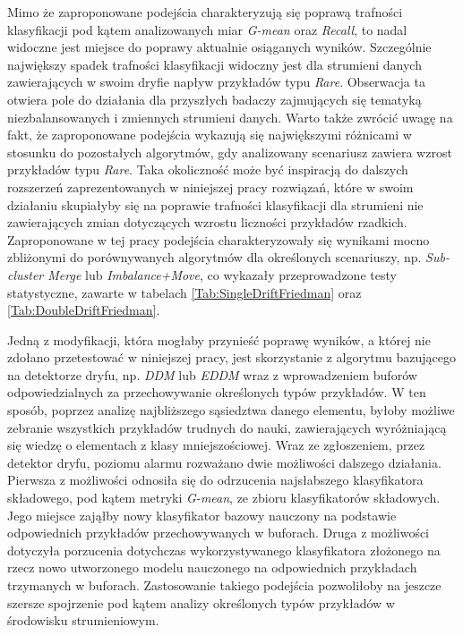 Mimo że zaproponowane podejścia charakteryzują się poprawą trafności klasyfikacji pod kątem analizowanych miar \textit{G-mean} oraz \textit{Recall}, to nadal widoczne jest miejsce do poprawy aktualnie osiąganych wyników. Szczególnie największy spadek trafności klasyfikacji widoczny jest dla strumieni danych zawierających w swoim dryfie napływ przykładów typu \textit{Rare}. Obserwacja ta otwiera pole do działania dla przyszłych badaczy zajmujących się tematyką niezbalansowanych i zmiennych strumieni danych. Warto także zwrócić uwagę na fakt, że zaproponowane podejścia wykazują się największymi różnicami w stosunku do pozostałych algorytmów, gdy analizowany scenariusz zawiera wzrost przykładów typu \textit{Rare}. Taka okoliczność może być inspiracją do dalszych rozszerzeń zaprezentowanych w niniejszej pracy rozwiązań, które w swoim działaniu skupiałyby się na poprawie trafności klasyfikacji dla strumieni nie zawierających zmian dotyczących wzrostu liczności przykładów rzadkich. Zaproponowane w tej pracy podejścia charakteryzowały się wynikami mocno zbliżonymi do porównywanych algorytmów dla określonych scenariuszy, np. \textit{Sub-cluster Merge} lub \textit{Imbalance+Move}, co wykazały przeprowadzone testy statystyczne, zawarte w tabelach \ref{Tab:SingleDriftFriedman} oraz \ref{Tab:DoubleDriftFriedman}.

Jedną z modyfikacji, która mogłaby przynieść poprawę wyników, a której nie zdołano przetestować w niniejszej pracy, jest skorzystanie z algorytmu bazującego na detektorze dryfu, np. \textit{DDM} lub \textit{EDDM} wraz z wprowadzeniem buforów odpowiedzialnych za przechowywanie określonych typów przykładów. W ten sposób, poprzez analizę najbliższego sąsiedztwa danego elementu, byłoby możliwe zebranie wszystkich przykładów trudnych do nauki, zawierających wyróżniającą się wiedzę o elementach z klasy mniejszościowej. Wraz ze zgłoszeniem, przez detektor dryfu, poziomu alarmu rozważano dwie możliwości dalszego działania. Pierwsza z możliwości odnosiła się do odrzucenia najsłabszego klasyfikatora składowego, pod kątem metryki \textit{G-mean}, ze zbioru klasyfikatorów składowych. Jego miejsce zająłby nowy klasyfikator bazowy nauczony na podstawie odpowiednich przykładów przechowywanych w buforach. Druga z możliwości dotyczyła porzucenia dotychczas wykorzystywanego klasyfikatora złożonego na rzecz nowo utworzonego modelu nauczonego na odpowiednich przykładach trzymanych w buforach. Zastosowanie takiego podejścia pozwoliłoby na jeszcze szersze spojrzenie pod kątem analizy określonych typów przykładów w środowisku strumieniowym.

\newpage\null\thispagestyle{empty}\newpage
